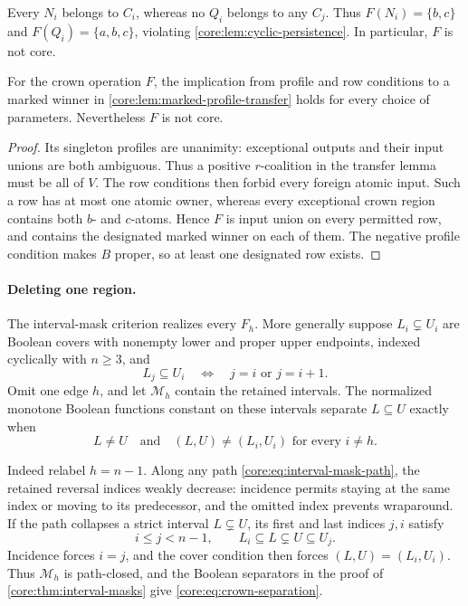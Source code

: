 Every $N_i$ belongs to $C_i$, whereas no $Q_i$ belongs to any $C_j$.
Thus $F(N_i)=\{b,c\}$ and $F(Q_i)=\{a,b,c\}$, violating
\cref{core:lem:cyclic-persistence}. In particular, $F$ is not core.

\begin{corollary}
\label{core:cor:marked-transfer-incomplete}
For the crown operation $F$, the implication from profile and row
conditions to a marked winner in \cref{core:lem:marked-profile-transfer}
holds for every choice of parameters. Nevertheless $F$ is not core.
\end{corollary}
\begin{proof}
Its singleton profiles are unanimity: exceptional outputs and their
input unions are both ambiguous. Thus a positive $r$-coalition in
the transfer lemma must be all of $V$. The row conditions then forbid
every foreign atomic input. Such a row has at most one atomic owner,
whereas every exceptional crown region contains both $b$- and
$c$-atoms. Hence $F$ is input union on every permitted row, and
contains the designated marked winner on each of them.
The negative profile condition makes $B$ proper, so at least one
designated row exists.
\end{proof}

\paragraph{Deleting one region.}
The interval-mask criterion realizes every $F_h$. More generally suppose
$L_i\subsetneq U_i$ are Boolean covers with nonempty lower and proper
upper endpoints, indexed cyclically with $n\geq3$, and
\begin{equation}\label{core:eq:crown-incidence}
 L_j\subseteq U_i\quad\Longleftrightarrow\quad j=i\text{ or }j=i+1.
\end{equation}
Omit one edge $h$, and let $\mathcal M_h$ contain the retained intervals.
The normalized monotone Boolean functions constant on these intervals
separate $L\subseteq U$ exactly when
\begin{equation}\label{core:eq:crown-separation}
 L\ne U\quad\text{and}\quad
 (L,U)\ne(L_i,U_i)\text{ for every }i\ne h.
\end{equation}

Indeed relabel $h=n-1$. Along any path
\eqref{core:eq:interval-mask-path}, the retained reversal indices weakly
decrease: incidence permits staying at the same index or moving to its
predecessor, and the omitted index prevents wraparound. If the path
collapses a strict interval $L\subsetneq U$, its first and last indices
$j,i$ satisfy
\[
 i\leq j<n-1,\qquad L_i\subseteq L\subsetneq U\subseteq U_j.
\]
Incidence forces $i=j$, and the cover condition then forces
$(L,U)=(L_i,U_i)$. Thus $\mathcal M_h$ is path-closed, and the Boolean
separators in the proof of \cref{core:thm:interval-masks} give
\eqref{core:eq:crown-separation}.

